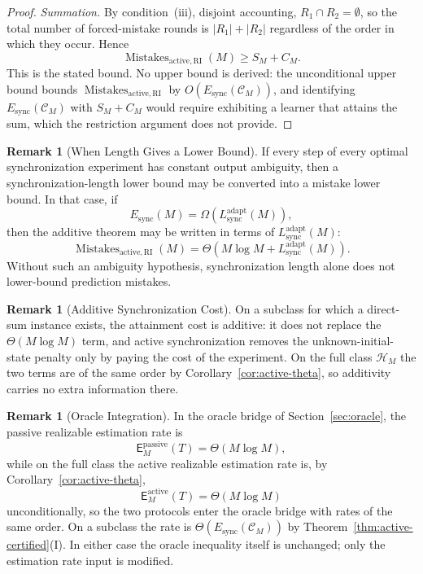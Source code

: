 \documentclass[12pt]{article}
\theoremstyle{definition}
\newtheorem{remark}[theorem]{Remark}
\newcommand{\Est}{\mathsf E}
\newcommand{\Lsync}{L_{\mathrm{sync}}^{\mathrm{adapt}}}
\newcommand{\Esync}{E_{\mathrm{sync}}}
\newcommand{\MistRI}{\operatorname{Mistakes}_{\mathrm{active,RI}}}
\begin{document}
\begin{proof}
\emph{Summation.}  By condition~(iii), disjoint accounting,
$R_1\cap R_2=\emptyset$, so the total number of forced-mistake rounds is
$|R_1|+|R_2|$ regardless of the order in which they occur.  Hence
\[
\MistRI(M)
\ge
S_M+C_M.
\]
This is the stated bound.  No upper bound is derived: the unconditional upper bound bounds $\MistRI$ by
$O(\Esync(\mathcal C_M))$, and identifying $\Esync(\mathcal C_M)$ with
$S_M+C_M$ would require exhibiting a learner that attains the sum, which the
restriction argument does not provide.
\end{proof}

\begin{remark}[When Length Gives a Lower Bound]
\label{rem:active-length-lower}
If every step of every optimal synchronization experiment has constant output
ambiguity, then a synchronization-length lower bound may be converted into a
mistake lower bound.  In that case, if
\[
\Esync(M)=\Omega(\Lsync(M)),
\]
then the additive theorem may be written in terms of $\Lsync(M)$:
\[
\MistRI(M)
=
\Theta(M\log M+\Lsync(M)).
\]
Without such an ambiguity hypothesis, synchronization length alone does not
lower-bound prediction mistakes.
\end{remark}

\begin{remark}[Additive Synchronization Cost]
\label{rem:active-additive}
On a subclass for which a direct-sum instance exists, the attainment cost is
additive: it does not replace the $\Theta(M\log M)$ term, and active
synchronization removes the unknown-initial-state penalty only by paying the
cost of the experiment.  On the full class $\mathcal H_M$ the two terms are of
the same order by Corollary~\ref{cor:active-theta}, so additivity carries no
extra information there.
\end{remark}

\begin{remark}[Oracle Integration]
\label{rem:active-oracle}
In the oracle bridge of Section~\ref{sec:oracle}, the passive realizable
estimation rate is
\[
\Est_M^{\mathrm{passive}}(T)
=
\Theta(M\log M),
\]
while on the full class the active realizable estimation rate is, by
Corollary~\ref{cor:active-theta},
\[
\Est_M^{\mathrm{active}}(T)
=
\Theta(M\log M)
\]
unconditionally, so the two protocols enter the oracle bridge with rates of the
same order.  On a subclass the rate is $\Theta(\Esync(\mathcal C_M))$ by
Theorem~\ref{thm:active-certified}(I).  In either case the oracle inequality
itself is unchanged; only the estimation rate input is modified.
\end{remark}
\end{document}

